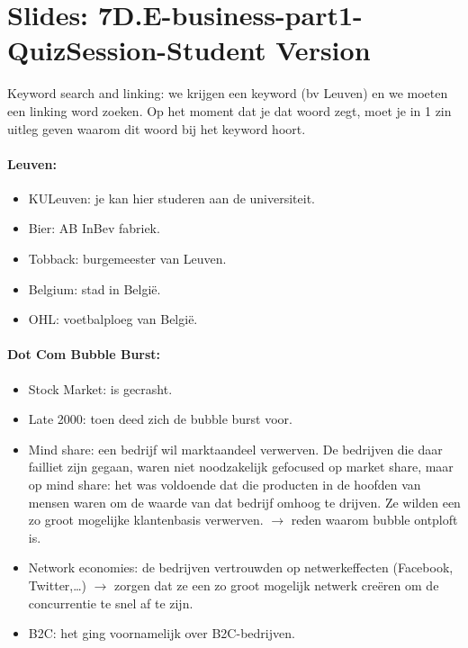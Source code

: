 \documentclass[10pt,a4paper]{report}
\begin{document}
\section{Slides: 7D.E-business-part1-QuizSession-Student Version}

Keyword search and linking: we krijgen een keyword (bv Leuven) en we moeten een linking word zoeken. Op het moment dat je dat woord zegt, moet je in 1 zin uitleg geven waarom dit woord bij het keyword hoort.
\paragraph{Leuven:}
\begin{itemize}
\item KULeuven: je kan hier studeren aan de universiteit.
\item Bier: AB InBev fabriek.
\item Tobback: burgemeester van Leuven.
\item Belgium: stad in België.
\item OHL: voetbalploeg van België.
\end{itemize}

\paragraph{Dot Com Bubble Burst:}
\begin{itemize}
\item Stock Market: is gecrasht.
\item Late 2000: toen deed zich de bubble burst voor.
\item Mind share: een bedrijf wil marktaandeel verwerven. De bedrijven die daar failliet zijn gegaan, waren niet noodzakelijk gefocused op market share, maar op mind share: het was voldoende dat die producten in de hoofden van mensen waren om de waarde van dat bedrijf omhoog te drijven. Ze wilden een zo groot mogelijke klantenbasis verwerven. $\rightarrow$ reden waarom bubble ontploft is.
\item Network economies: de bedrijven vertrouwden op netwerkeffecten (Facebook, Twitter,…) $\rightarrow$ zorgen dat ze een zo groot mogelijk netwerk creëren om de concurrentie te snel af te zijn.
\item B2C: het ging voornamelijk over B2C-bedrijven.
\end{itemize}
\end{document}
